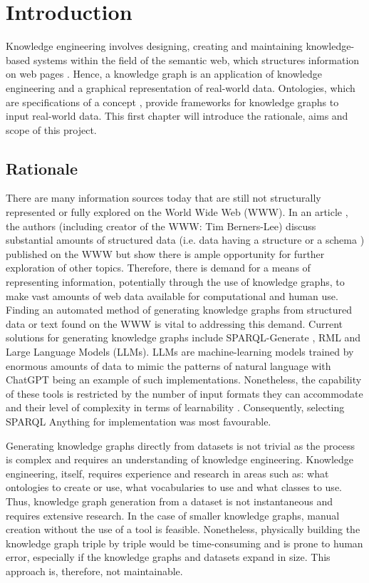 \chapter{Introduction}
Knowledge engineering involves designing, creating and maintaining knowledge-based systems \cite{studer_benjamins_fensel_1998} within the field of the semantic web, which structures information on web pages \cite{berners2001semantic}. Hence, a knowledge graph is an application of knowledge engineering and a graphical representation of real-world data. Ontologies, which are specifications of a concept \cite{Breitman2007}, provide frameworks for knowledge graphs to input real-world data. This first chapter will introduce the rationale, aims and scope of this project. 

\section{Rationale}
\hspace{0.5cm} There are many information sources today that are still not structurally represented or fully explored on the World Wide Web (WWW). In an article \cite{bizer2011linked}, the authors (including creator of the WWW: Tim Berners-Lee) discuss substantial amounts of structured data (i.e. data having a structure or a schema \cite{arasu_garcia-molina_university_2003}) published on the WWW but show there is ample opportunity for further exploration of other topics. Therefore, there is demand for a means of representing information, potentially through the use of knowledge graphs, to make vast amounts of web data available for computational and human use. Finding an automated method of generating knowledge graphs from structured data or text found on the WWW is vital to addressing this demand. Current solutions for generating knowledge graphs include SPARQL-Generate \cite{sparqlgenerate}, RML \cite{rml} and Large Language Models (LLMs). LLMs are machine-learning models trained by enormous amounts of data to mimic the patterns of natural language with ChatGPT \cite{chatgptwebsite} being an example of such implementations. Nonetheless, the capability of these tools is restricted by the number of input formats they can accommodate and their level of complexity in terms of learnability \cite{sparqlanything}. Consequently, selecting SPARQL Anything \cite{sparqlanythinggithub} for implementation was most favourable. 

Generating knowledge graphs directly from datasets is not trivial as the process is complex and requires an understanding of knowledge engineering. Knowledge engineering, itself, requires experience and research in areas such as: what ontologies to create or use, what vocabularies to use and what classes to use. Thus, knowledge graph generation from a dataset is not instantaneous and requires extensive research. In the case of smaller knowledge graphs, manual creation without the use of a tool is feasible. Nonetheless, physically building the knowledge graph triple by triple would be time-consuming and is prone to human error, especially if the knowledge graphs and datasets expand in size. This approach is, therefore, not maintainable. 

